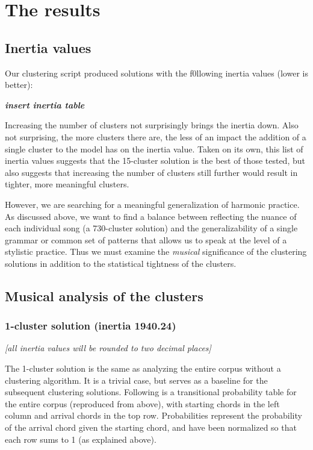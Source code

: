 \chapter{The results}
\label{theresults}

\section{Inertia values}
\label{inertiavalues}

Our clustering script produced solutions with the f0llowing inertia values (lower is better):

\textbf{\emph{insert inertia table}}

Increasing the number of clusters not surprisingly brings the inertia down. Also not surprising, the more clusters there are, the less of an impact the addition of a single cluster to the model has on the inertia value. Taken on its own, this list of inertia values suggests that the 15-cluster solution is the best of those tested, but also suggests that increasing the number of clusters still further would result in tighter, more meaningful clusters.

However, we are searching for a meaningful generalization of harmonic practice. As discussed above, we want to find a balance between reflecting the nuance of each individual song (a 730-cluster solution) and the generalizability of a single grammar or common set of patterns that allows us to speak at the level of a stylistic practice. Thus we must examine the \emph{musical} significance of the clustering solutions in addition to the statistical tightness of the clusters.

\section{Musical analysis of the clusters}
\label{musicalanalysisoftheclusters}

\subsection{1-cluster solution (inertia 1940.24)}
\label{1-clustersolutioninertia1940.24}

\emph{[all inertia values will be rounded to two decimal places]}

The 1-cluster solution is the same as analyzing the entire corpus without a clustering algorithm. It is a trivial case, but serves as a baseline for the subsequent clustering solutions. Following is a transitional probability table for the entire corpus (reproduced from above), with starting chords in the left column and arrival chords in the top row. Probabilities represent the probability of the arrival chord given the starting chord, and have been normalized so that each row sums to 1 (as explained above).

